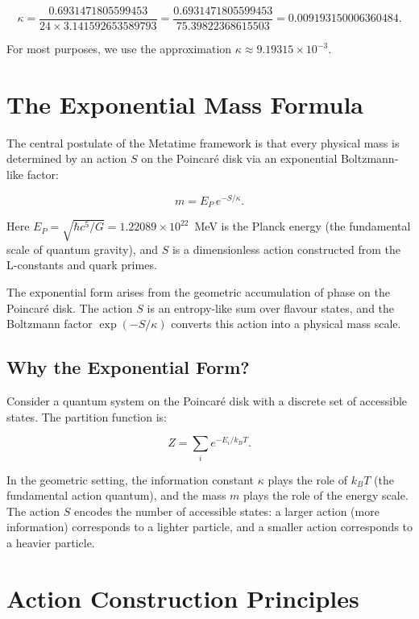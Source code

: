 \[
\kappa = \frac{0.6931471805599453}{24 \times 3.141592653589793}
       = \frac{0.6931471805599453}{75.39822368615503}
       = 0.009193150006360484.
\]

\noindent For most purposes, we use the approximation \(\kappa \approx
9.19315 \times 10^{-3}\).

\section{The Exponential Mass Formula}

The central postulate of the Metatime framework is that every physical mass
is determined by an action \(S\) on the Poincar\'{e} disk via an exponential
Boltzmann-like factor:

\begin{equation}
m = E_P \, e^{-S/\kappa}.
\label{eq:mass_formula}
\end{equation}

Here \(E_P = \sqrt{\hbar c^5 / G} = 1.22089 \times 10^{22}\)~MeV is the Planck
energy (the fundamental scale of quantum gravity), and \(S\) is a
dimensionless action constructed from the L-constants and quark primes.

The exponential form arises from the geometric accumulation of phase on the
Poincar\'{e} disk.  The action \(S\) is an entropy-like sum over flavour
states, and the Boltzmann factor \(\exp(-S/\kappa)\) converts this action into
a physical mass scale.

\subsection{Why the Exponential Form?}

Consider a quantum system on the Poincar\'{e} disk with a discrete set of
accessible states.  The partition function is:

\[
Z = \sum_i e^{-E_i / k_B T}.
\]

In the geometric setting, the information constant \(\kappa\) plays the role
of \(k_B T\) (the fundamental action quantum), and the mass \(m\) plays the
role of the energy scale.  The action \(S\) encodes the number of accessible
states: a larger action (more information) corresponds to a lighter particle,
and a smaller action corresponds to a heavier particle.

\section{Action Construction Principles}

